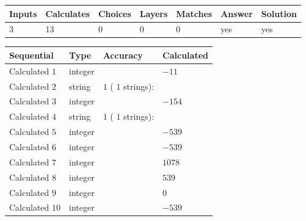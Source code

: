 \documentclass[12pt]{article}
\begin{document}
 
 
\noindent{}
 
 

 
\vspace{0.3in}
   
   
   
   
\noindent\begin{tabular}{|l|l|l|l|l|l|l|}
 \hline
Inputs & Calculates & Choices & Layers & Matches & Answer & Solution \\ \hline
           3  & 
          13  & 
           0
  & 
           0  & 
           0  & 
  yes & 
  yes 
  \\ \hline
 \end{tabular}
   
   
   
   
\noindent{}
   
   
  
  
\noindent\begin{tabular}{|l|l|l|l|}
\hline
 Sequential & Type & Accuracy & Calculated \\ 
\hline
 
 
  Calculated $            1 $ & integer &  & 
  $ -11 $ 
 \\  \hline  
 
 
  Calculated $            2 $ & string & $            1  $ ( $           1  $ strings): 
 & 
 \\  \hline  
 
 
  Calculated $            3 $ & integer &  & 
  $ -154 $ 
 \\  \hline  
 
 
  Calculated $            4 $ & string & $            1  $ ( $           1  $ strings): 
 & 
 \\  \hline  
 
 
  Calculated $            5 $ & integer &  & 
  $ -539 $ 
 \\  \hline  
 
 
  Calculated $            6 $ & integer &  & 
  $ -539 $ 
 \\  \hline  
 
 
  Calculated $            7 $ & integer &  & 
  $ 1078 $ 
 \\  \hline  
 
 
  Calculated $            8 $ & integer &  & 
  $ 539 $ 
 \\  \hline  
 
 
  Calculated $            9 $ & integer &  & 
  $ 0 $ 
 \\  \hline  
 
 
  Calculated $           10 $ & integer &  & 
  $ -539 $ 
 \\  \hline  
 \end{tabular}
   
\end{document}
